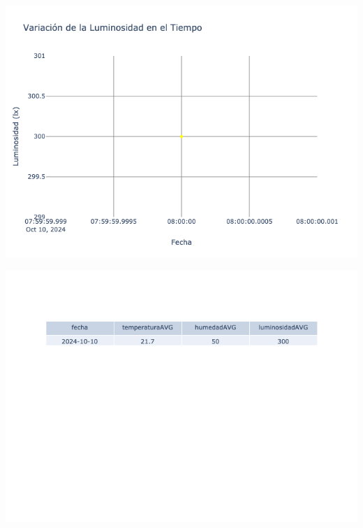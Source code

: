\documentclass{article}
\begin{document}
    \noindent
    \begin{minipage}{0.48\textwidth}
        \centering
        \includegraphics[width=\textwidth]{../img/poli/LS402-90Dias-03-12-2024.png}
    \end{minipage}
    \hfill
    \begin{minipage}{0.48\textwidth}
        \centering
        \includegraphics[width=\textwidth]{../img/tables/CAVG402-90Dias-03-12-2024.png}
    \end{minipage}
    
\end{document}
